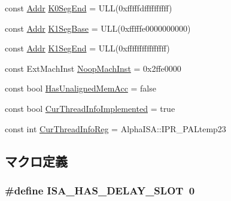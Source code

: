\begin{DoxyCompactItemize}
\item 
const \hyperlink{base_2types_8hh_af1bb03d6a4ee096394a6749f0a169232}{Addr} \hyperlink{namespaceAlphaISA_acc102ef1fcdb799119ec7b33af4198f0}{K0SegEnd} = ULL(0xfffffdffffffffff)
\item 
const \hyperlink{base_2types_8hh_af1bb03d6a4ee096394a6749f0a169232}{Addr} \hyperlink{namespaceAlphaISA_af3e520006557877e41eafa56b43b35b8}{K1SegBase} = ULL(0xfffffe0000000000)
\item 
const \hyperlink{base_2types_8hh_af1bb03d6a4ee096394a6749f0a169232}{Addr} \hyperlink{namespaceAlphaISA_a1c845959a4414a849c86e1064d650fc7}{K1SegEnd} = ULL(0xffffffffffffffff)
\item 
const ExtMachInst \hyperlink{namespaceAlphaISA_a8d1e39e0ea757dcc9725c6ccd81dd4c4}{NoopMachInst} = 0x2ffe0000
\item 
const bool \hyperlink{namespaceAlphaISA_a1c3adbc67ce574fe545e332d3bc677be}{HasUnalignedMemAcc} = false
\item 
const bool \hyperlink{namespaceAlphaISA_a9faf3aac879cfa867d4ae15d4119c45e}{CurThreadInfoImplemented} = true
\item 
const int \hyperlink{namespaceAlphaISA_a7e5bf2f33f34327efc1eeccbb0c1141f}{CurThreadInfoReg} = AlphaISA::IPR\_\-PALtemp23
\end{DoxyCompactItemize}


\subsection{マクロ定義}
\hypertarget{alpha_2isa__traits_8hh_aae21ac6833454e7ead9810c372658afc}{
\subsubsection[{ISA\_\-HAS\_\-DELAY\_\-SLOT}]{\setlength{\rightskip}{0pt plus 5cm}\#define ISA\_\-HAS\_\-DELAY\_\-SLOT~0}}
\label{alpha_2isa__traits_8hh_aae21ac6833454e7ead9810c372658afc}
